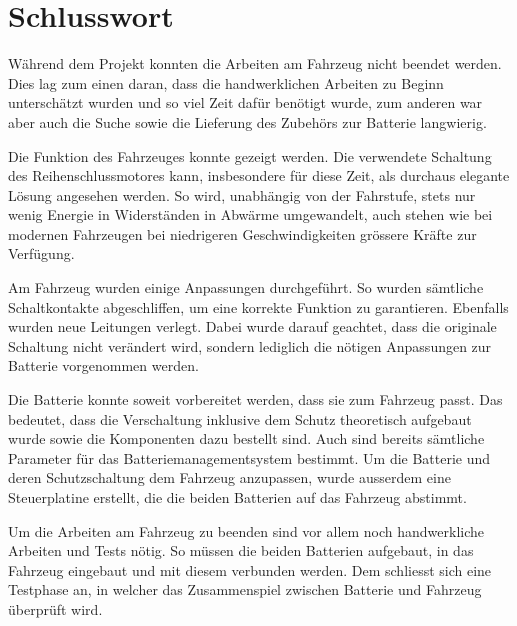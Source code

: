\chapter{Schlusswort}
Während dem Projekt konnten die Arbeiten am Fahrzeug nicht beendet werden. Dies lag zum einen daran, dass die handwerklichen Arbeiten zu Beginn unterschätzt wurden und so viel Zeit dafür benötigt wurde, zum anderen war aber auch die Suche sowie die Lieferung des Zubehörs zur Batterie langwierig.

Die Funktion des Fahrzeuges konnte gezeigt werden. Die verwendete Schaltung des Reihenschlussmotores kann, insbesondere für diese Zeit, als durchaus elegante Lösung angesehen werden. So wird, unabhängig von der Fahrstufe, stets nur wenig Energie in Widerständen in Abwärme umgewandelt, auch stehen wie bei modernen Fahrzeugen bei niedrigeren Geschwindigkeiten grössere Kräfte zur Verfügung.

Am Fahrzeug wurden einige Anpassungen durchgeführt. So wurden sämtliche Schaltkontakte abgeschliffen, um eine korrekte Funktion zu garantieren. Ebenfalls wurden neue Leitungen verlegt. Dabei wurde darauf geachtet, dass die originale Schaltung nicht verändert wird, sondern lediglich die nötigen Anpassungen zur Batterie vorgenommen werden.

Die Batterie konnte soweit vorbereitet werden, dass sie zum Fahrzeug passt. Das bedeutet, dass die Verschaltung inklusive dem Schutz theoretisch aufgebaut wurde sowie die Komponenten dazu bestellt sind. Auch sind bereits sämtliche Parameter für das Batteriemanagementsystem bestimmt. Um die Batterie und deren Schutzschaltung dem Fahrzeug anzupassen, wurde ausserdem eine Steuerplatine erstellt, die die beiden Batterien auf das Fahrzeug abstimmt.

Um die Arbeiten am Fahrzeug zu beenden sind vor allem noch handwerkliche Arbeiten und Tests nötig. So müssen die beiden Batterien aufgebaut, in das Fahrzeug eingebaut und mit diesem verbunden werden. Dem schliesst sich eine Testphase an, in welcher das Zusammenspiel zwischen Batterie und Fahrzeug überprüft wird.